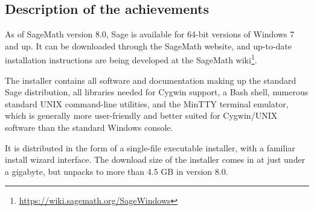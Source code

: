 \hypertarget{description-of-the-achievements}{%
\subsection{Description of the
achievements}\label{description-of-the-achievements}}

As of SageMath version 8.0, Sage is available for 64-bit versions of
Windows 7 and up. It can be downloaded through the SageMath website, and
up-to-date installation instructions are being developed at the SageMath
wiki\footnote{\url{https://wiki.sagemath.org/SageWindows}}.

The installer contains all software and documentation making up the standard
Sage distribution, all libraries needed for Cygwin support, a Bash shell,
numerous standard UNIX command-line utilities, and the MinTTY terminal
emulator, which is generally more user-friendly and better suited for
Cygwin/UNIX software than the standard Windows console.

It is distributed in the form of a single-file executable installer, with a
familiar install wizard interface. The download size of the installer comes in
at just under a gigabyte, but unpacks to more than 4.5 GB in version 8.0.

